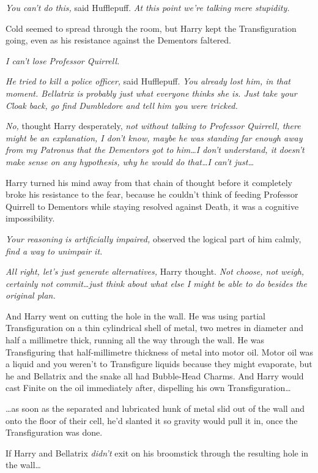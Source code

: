 \emph{You can’t do this,} said Hufflepuff. \emph{At this point we’re talking mere stupidity.}

Cold seemed to spread through the room, but Harry kept the Transfiguration going, even as his resistance against the Dementors faltered.

\emph{I can’t lose Professor Quirrell.}

\emph{He tried to kill a police officer,} said Hufflepuff. \emph{You already lost him, in that moment. Bellatrix is probably just what everyone thinks she is. Just take your Cloak back, go find Dumbledore and tell him you were tricked.}

\emph{No,} thought Harry desperately, \emph{not without talking to Professor Quirrell, there might be an explanation, I don’t know, maybe he was standing far enough away from my Patronus that the Dementors got to him…I don’t understand, it doesn’t make sense on any hypothesis, why he would do that…I can’t just…}

Harry turned his mind away from that chain of thought before it completely broke his resistance to the fear, because he couldn’t think of feeding Professor Quirrell to Dementors while staying resolved against Death, it was a cognitive impossibility.

\emph{Your reasoning is artificially impaired,} observed the logical part of him calmly, \emph{find a way to unimpair it.}

\emph{All right, let’s just generate alternatives,} Harry thought. \emph{Not choose, not weigh, certainly not commit…just think about what else I might be able to do besides the original plan.}

And Harry went on cutting the hole in the wall. He was using partial Transfiguration on a thin cylindrical shell of metal, two metres in diameter and half a millimetre thick, running all the way through the wall. He was Transfiguring that half-millimetre thickness of metal into motor oil. Motor oil was a liquid and you weren’t to Transfigure liquids because they might evaporate, but he and Bellatrix and the snake all had Bubble-Head Charms. And Harry would cast Finite on the oil immediately after, dispelling his own Transfiguration…

…as soon as the separated and lubricated hunk of metal slid out of the wall and onto the floor of their cell, he’d slanted it so gravity would pull it in, once the Transfiguration was done.

If Harry and Bellatrix \emph{didn’t} exit on his broomstick through the resulting hole in the wall…

